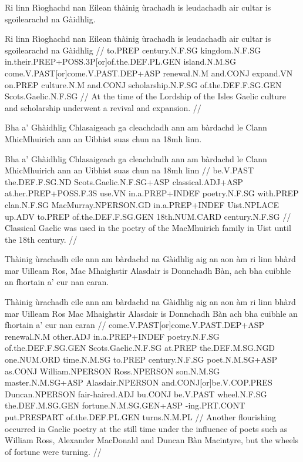 \documentclass[a4paper,10pt]{article}
\begin{document}
\ex
\begingl
\glpre Ri linn Rìoghachd nan Eilean thàinig ùrachadh is leudachadh air cultar is sgoilearachd na Gàidhlig. 

\vspace{4mm}
\gla Ri linn Rìoghachd nan Eilean thàinig ùrachadh is leudachadh air cultar is sgoilearachd na Gàidhlig  //
\glb to.PREP century.N.F.SG kingdom.N.F.SG in.their.PREP+POSS.3P[or]of.the.DEF.PL.GEN island.N.M.SG come.V.PAST[or]come.V.PAST.DEP+ASP renewal.N.M and.CONJ expand.VN on.PREP culture.N.M and.CONJ scholarship.N.F.SG of.the.DEF.F.SG.GEN Scots.Gaelic.N.F.SG  //
\glft At the time of the Lordship of the Isles Gaelic culture and scholarship underwent a revival and expansion. //
\endgl
\xe

\ex
\begingl
\glpre Bha a' Ghàidhlig Chlasaigeach ga cleachdadh ann am bàrdachd le Clann MhicMhuirich ann an Uibhist suas chun na 18mh linn. 

\vspace{4mm}
\gla Bha a' Ghàidhlig Chlasaigeach ga cleachdadh {ann am} bàrdachd le Clann MhicMhuirich {ann an} Uibhist suas chun na 18mh linn  //
\glb be.V.PAST the.DEF.F.SG.ND Scots.Gaelic.N.F.SG+ASP classical.ADJ+ASP at.her.PREP+POSS.F.3S use.VN in.a.PREP+INDEF poetry.N.F.SG with.PREP clan.N.F.SG MacMurray.NPERSON.GD in.a.PREP+INDEF Uist.NPLACE up.ADV to.PREP of.the.DEF.F.SG.GEN 18th.NUM.CARD century.N.F.SG  //
\glft Classical Gaelic was used in the poetry of the MacMhuirich family in Uist until the 18th century. //
\endgl
\xe

\ex
\begingl
\glpre Thàinig ùrachadh eile ann am bàrdachd na Gàidhlig aig an aon àm ri linn bhàrd mar Uilleam Ros, Mac Mhaighstir Alasdair is Donnchadh Bàn, ach bha cuibhle an fhortain a' cur nan caran. 

\vspace{4mm}
\gla Thàinig ùrachadh eile {ann am} bàrdachd na Gàidhlig aig an aon àm ri linn bhàrd mar Uilleam Ros Mac Mhaighstir Alasdair is Donnchadh Bàn ach bha cuibhle an fhortain a' cur nan caran  //
\glb come.V.PAST[or]come.V.PAST.DEP+ASP renewal.N.M other.ADJ in.a.PREP+INDEF poetry.N.F.SG of.the.DEF.F.SG.GEN Scots.Gaelic.N.F.SG at.PREP the.DEF.M.SG.NGD one.NUM.ORD time.N.M.SG to.PREP century.N.F.SG poet.N.M.SG+ASP as.CONJ William.NPERSON Ross.NPERSON son.N.M.SG master.N.M.SG+ASP Alasdair.NPERSON and.CONJ[or]be.V.COP.PRES Duncan.NPERSON fair-haired.ADJ bu.CONJ be.V.PAST wheel.N.F.SG the.DEF.M.SG.GEN fortune.N.M.SG.GEN+ASP -ing.PRT.CONT put.PRESPART of.the.DEF.PL.GEN turns.N.M.PL  //
\glft Another flourishing occurred in Gaelic poetry at the still time under the influence of poets such as William Ross, Alexander MacDonald and Duncan Bàn Macintyre, but the wheels of fortune were turning. //
\endgl
\xe
\end{document}
